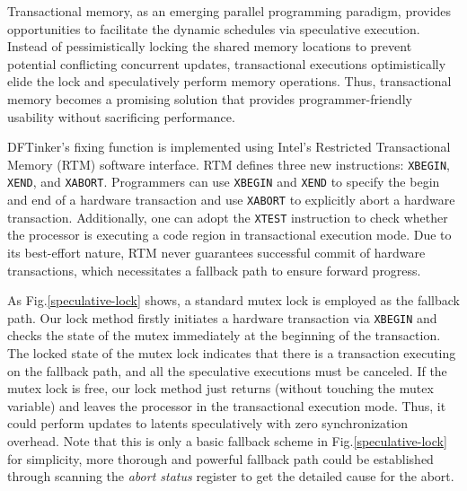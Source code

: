 \documentclass[10pt]{llncs}
\begin{document}
Transactional memory, as an emerging parallel programming paradigm, provides opportunities to facilitate the dynamic schedules via speculative execution. Instead of pessimistically locking the shared memory locations to prevent potential conflicting concurrent updates, transactional executions optimistically elide the lock and speculatively perform memory operations. Thus, transactional memory becomes a promising solution that provides programmer-friendly usability without sacrificing performance.

DFTinker's fixing function is implemented using Intel's Restricted Transactional Memory (RTM) software interface. RTM defines three new instructions: \verb:XBEGIN:, \verb:XEND:, and \verb:XABORT:. Programmers can use \verb:XBEGIN: and \verb:XEND: to specify the begin and end of a hardware transaction and use \verb:XABORT: to explicitly abort a hardware transaction. Additionally, one can adopt the \verb:XTEST: instruction to check whether the processor is executing a code region in transactional execution mode. Due to its best-effort nature, RTM never guarantees successful commit of hardware transactions, which necessitates a fallback path to ensure forward progress.




As Fig.\ref{speculative-lock} shows, a standard mutex lock is employed as the fallback path. 
Our lock method firstly initiates a hardware transaction via \verb:XBEGIN: and checks the state of the mutex immediately at the beginning of the transaction. The locked state of the mutex lock indicates that there is a transaction executing on the fallback path, and all the speculative executions must be canceled. 
If the mutex lock is free, our lock method just returns (without touching the mutex variable) and leaves the processor in the transactional execution mode. Thus, it could perform updates to latents speculatively with zero synchronization overhead. 
Note that this is only a basic fallback scheme in Fig.\ref{speculative-lock} for simplicity, 
more thorough and powerful fallback path could be established through scanning the \textit{abort status} register to get the detailed cause for the abort. 
\end{document}
